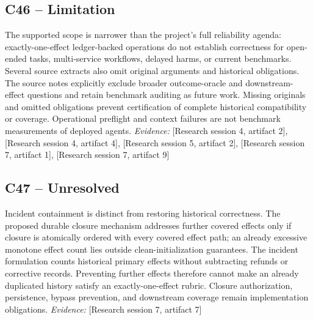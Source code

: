 \documentclass[11pt]{article}
\begin{document}
\subsection{C46 -- Limitation}
The supported scope is narrower than the project's full reliability agenda: exactly-one-effect ledger-backed operations do not establish correctness for open-ended tasks, multi-service workflows, delayed harms, or current benchmarks. Several source extracts also omit original arguments and historical obligations.
The source notes explicitly exclude broader outcome-oracle and downstream-effect questions and retain benchmark auditing as future work. Missing originals and omitted obligations prevent certification of complete historical compatibility or coverage. Operational preflight and context failures are not benchmark measurements of deployed agents.
\textit{Evidence: }[Research session 4, artifact 2], [Research session 4, artifact 4], [Research session 5, artifact 2], [Research session 7, artifact 1], [Research session 7, artifact 9]
\subsection{C47 -- Unresolved}
Incident containment is distinct from restoring historical correctness. The proposed durable closure mechanism addresses further covered effects only if closure is atomically ordered with every covered effect path; an already excessive monotone effect count lies outside clean-initialization guarantees.
The incident formulation counts historical primary effects without subtracting refunds or corrective records. Preventing further effects therefore cannot make an already duplicated history satisfy an exactly-one-effect rubric. Closure authorization, persistence, bypass prevention, and downstream coverage remain implementation obligations.
\textit{Evidence: }[Research session 7, artifact 7]
\end{document}
